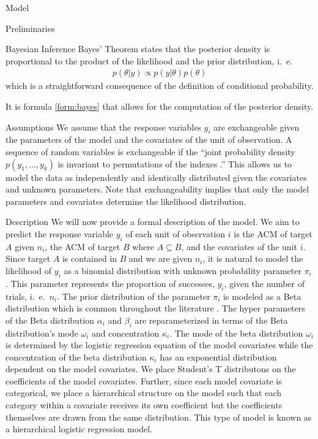 \begin{chapter}{Model}
\begin{section}{Preliminaries}
\begin{subsection}{Bayesian Inference}
    Bayes' Theorem states that the posterior density is proportional to the product
    of the likelihood and the prior distribution, i.\ e.\
    \begin{align}\label{form:bayes}
      p(\theta | y) \propto p(y | \theta) p(\theta)
    \end{align}
    which is a straightforward consequence of the definition of conditional probability.

    It is formula \ref{form:bayes} that allows for the computation of the posterior density.
  \end{subsection}
\end{section}

\begin{section}{Assumptions}
  We assume that the response variables $y_i$ are exchangeable given the parameters of the model
  and the covariates of the unit of observation. A sequence of random variables
  is exchangeable if the ``joint probability density $p(y_1, \dots, y_k)$ is invariant to permutations of the indexes \cite{bda3}.''
  This allows us to model the data as independently and identically distributed given the covariates and unknown parameters.
  Note that exchangeability implies that only the model parameters and covariates determine the likelihood distribution.
\end{section}

\begin{section}{Description}
  We will now provide a formal description of the model.
  We aim to predict the response variable $y_i$ of each unit of
  observation $i$ is the ACM of target $A$ given $n_i$, the ACM of target $B$ where $A \subseteq B$,
  and the covariates of the unit $i$. Since target $A$ is
  contained in $B$ and we are given $n_i$, it is natural to model the likelihood of
  $y_i$ as a binomial distribution with unknown probability parameter $\pi_i$. This parameter
  represents the proportion of successes, $y_i$, given the number of trials, i.\ e.\ $n_i$.
  The prior distribution of the parameter $\pi_i$ is modeled as a Beta distribution which
  is common throughout the literature \cite{bda3, kruschke}.
  The hyper parameters of the Beta distribution $\alpha_i$ and $\beta_i$ are reparameterized in terms of the Beta distribution's
  mode $\omega_i$ and concentration $\kappa_i$.
  The mode of the beta distribution $\omega_i$ is determined by the logistic regression equation
  of the model covariates while
  the concentration of the beta distribution $\kappa_i$ has an exponential distribution dependent on the model covariates.
  We place Student's T distributons on the coefficients of the model covariates. Further, since each model covariate is categorical,
  we place a hierarchical structure on the model such that each category within a covariate receives its own coefficient
  but the coefficients themselves are drawn from the same distribution. This type of model is known as a hierarchical logistic regression model.


\end{section}
\end{chapter}
